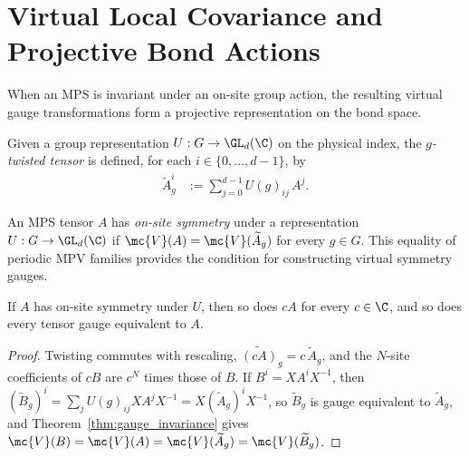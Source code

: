 \section{Virtual Local Covariance and Projective Bond Actions}
\label{sec:injective_symmetry_cocycle}

When an MPS is invariant under an on-site group action, the resulting virtual
gauge transformations form a projective representation on the bond space.

\begin{definition}\label{def:twisted_tensor}
    \leanok
    Given a group representation $U : G \to \GL_{d}(\C)$ on the physical
    index, the \emph{$g$-twisted tensor} is defined, for each
    $i \in \{0,\ldots,d{-}1\}$, by
    \begin{align}
        \widetilde{A}_g^i
         & :=\sum_{j=0}^{d-1}U(g)_{ij}\,A^j.
        \label{eq:symmetry_twisted_tensor}
    \end{align}
\end{definition}

\begin{definition}\label{def:on_site_symmetric}
    \leanok
    An MPS tensor $A$ has \emph{on-site symmetry} under a representation
    $U:G\to\GL_d(\C)$ if $\mc{V}(A)=\mc{V}(\widetilde A_g)$ for every $g\in G$.
    This equality of periodic MPV families provides the condition for constructing
    virtual symmetry gauges.
\end{definition}

\begin{lemma}\label{lem:on_site_symmetric_smul_gauge}
    \leanok
    If $A$ has on-site symmetry under $U$, then so does $cA$ for every
    $c\in\C$, and so does every tensor gauge equivalent to $A$.
\end{lemma}

\begin{proof}\leanok
    Twisting commutes with rescaling, $\widetilde{(cA)}_g=c\,\widetilde A_g$, and
    the $N$-site coefficients of $cB$ are $c^N$ times those of $B$. If
    $B^i=XA^iX^{-1}$, then
    $(\widetilde B_g)^i=\sum_j U(g)_{ij}XA^jX^{-1}=X(\widetilde A_g)^iX^{-1}$, so
    $\widetilde B_g$ is gauge equivalent to $\widetilde A_g$, and
    Theorem~\ref{thm:gauge_invariance} gives
    $\mc{V}(B)=\mc{V}(A)=\mc{V}(\widetilde A_g)=\mc{V}(\widetilde B_g)$.
\end{proof}

